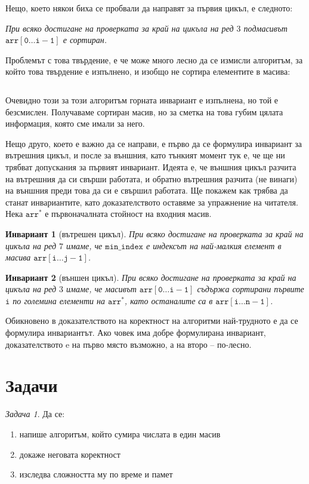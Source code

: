 \documentclass{article}
\theoremstyle{definition}
\theoremstyle{plain}
\newtheorem*{invariant}{Инвариант}
\theoremstyle{remark}
\newtheorem{problem}{Задача}
\theoremstyle{definition}
\begin{document}
Нещо, което някои биха се пробвали да направят за първия цикъл, е следното:
\begin{center}
    \textit{При всяко достигане на проверката за край на цикъла на ред $3$ подмасивът $\mathtt{arr[0 \dots i - 1]}$ е сортиран.}
\end{center}

Проблемът с това твърдение, е че може много лесно да се измисли алгоритъм, за който това твърдение е изпълнено, и изобщо не сортира елементите в масива:
\inputminted[linenos]{c++}{algorithms/trust_me_it_sorts.cpp}

Очевидно този за този алгоритъм горната инвариант е изпълнена, но той е безсмислен.
Получаваме сортиран масив, но за сметка на това губим цялата информация, която сме имали за него.

Нещо друго, което е важно да се направи, е първо да се формулира инвариант за вътрешния цикъл, и после за външния, като тънкият момент тук е, че ще ни трябват допускания за първият инвариант.
Идеята е, че външния цикъл разчита на вътрешния да си свърши работата, и обратно вътрешния разчита (не винаги) на външния преди това да си е свършил работата.
Ще покажем как трябва да станат инвариантите, като доказателството оставяме за упражнение на читателя.
Нека $\mathtt{arr^*}$ е първоначалната стойност на входния масив.
\begin{invariant}[вътрешен цикъл]
    При всяко достигане на проверката за край на цикъла на ред $7$ имаме, че $\mathtt{min\_index}$ е индексът на най-малкия елемент в масива $\mathtt{arr[i \dots j - 1]}$.
\end{invariant}

\begin{invariant}[външен цикъл]
    При всяко достигане на проверката за край на цикъла на ред $3$ имаме, че масивът $\mathtt{arr[0 \dots i - 1]}$ съдържа сортирани първите $\mathtt{i}$ по големина елементи на $\mathtt{arr^*}$, като останалите са в $\mathtt{arr[i \dots n - 1]}$.
\end{invariant}

Обикновено в доказателството на коректност на алгоритми най-трудното е да се формулира инвариантът.
Ако човек има добре формулирана инвариант, доказателството e на първо място възможно, а на второ -- по-лесно.

\section*{Задачи}

\begin{problem}
Да се:
\begin{enumerate}
    \item напише алгоритъм, който сумира числата в един масив
    \item докаже неговата коректност
    \item изследва сложността му по време и памет
\end{enumerate}
\end{problem}
\end{document}
